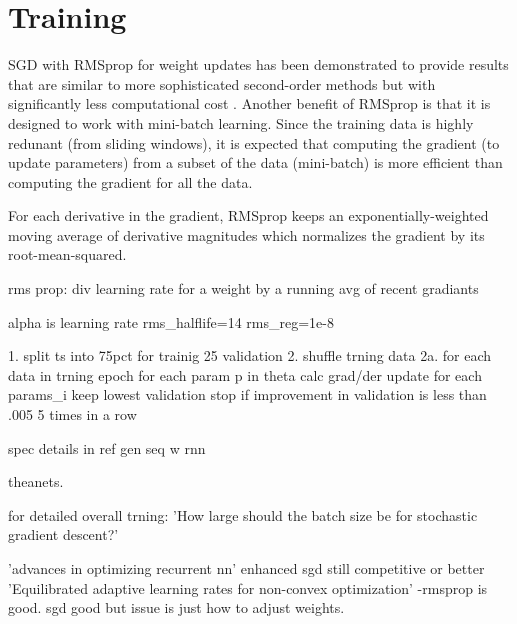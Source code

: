 \section{Training}


SGD with RMSprop \cite{Tieleman2012} for weight updates has been demonstrated to provide results that are similar to more sophisticated second-order methods but with significantly less computational cost \cite{Dauphin}.
%
Another benefit of RMSprop is that it is designed to work with mini-batch learning.
%
Since the training data is highly redunant (from sliding windows), it is expected that computing the gradient (to update parameters) from a subset of the data (mini-batch) is more efficient than computing the gradient for all the data.


For each derivative in the gradient, RMSprop keeps an exponentially-weighted moving average of derivative magnitudes which normalizes the gradient by its root-mean-squared.

rms prop: div learning rate for a weight by a running avg of recent gradiants

alpha is learning rate
rms_halflife=14
rms_reg=1e-8

1. split ts into 75pct for trainig 25 validation
2. shuffle trning data
2a. for each data in trning epoch
for each param p in theta
calc grad/der
update for each params_i
keep lowest validation
stop if improvement in validation is less than .005 5 times in a row

spec details in ref gen seq w rnn

theanets.

for detailed overall trning: 'How large should the batch size be for stochastic gradient descent?'


'advances in optimizing recurrent nn' enhanced sgd still competitive or better
'Equilibrated adaptive learning rates for non-convex optimization' -rmsprop is good. sgd good but issue is just how to adjust weights.


